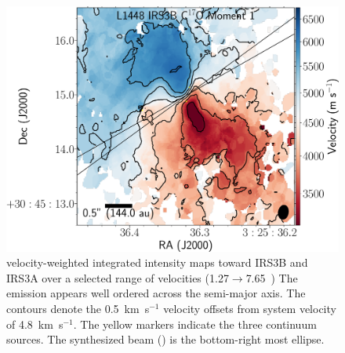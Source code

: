 \begin{figure}[H]
\end{figure}

\begin{figure}[H]
\begin{center}
   \includegraphics[width=1\textwidth]{img/L1448IRS3B_C17O_image_taper1500k_image_M1_fits.pdf}  %
\end{center}
   \caption{\cso\space velocity-weighted integrated intensity maps toward IRS3B and IRS3A over a selected range of velocities (1.27$\rightarrow$7.65~\kms) The \cso\space emission appears well ordered across the semi-major axis. The contours denote the 0.5~km~s$^{-1}$ velocity offsets from system velocity of 4.8~km~s$^{-1}$. The yellow markers indicate the three continuum sources.  The \cso\space synthesized beam (\csobeam) is the bottom-right most ellipse.}\label{fig:irs3abc17omoment1}
\end{figure}


